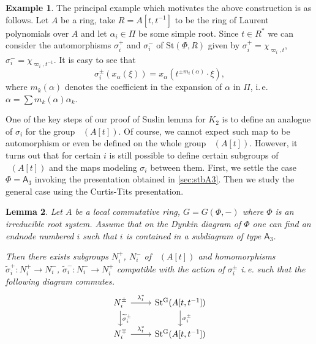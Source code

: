 \documentclass[oneside,12pt]{amsart}
\numberwithin{equation}{section}
\newtheorem{lem}{Lemma}
\numberwithin{lem}{section}
\theoremstyle{definition}
\newtheorem{example}[lem]{Example}
\theoremstyle{remark}
\DeclareMathOperator{\St}{St^G}
\newcommand{\Stb}{\mathrm{St}}
\newcommand{\rA}{\mathsf{A}}
\begin{document}
\begin{example} The principal example which motivates the above construction is as follows.
Let $A$ be a ring, take $R = A[t, t^{-1}]$ to be the ring of Laurent polynomials over $A$ and let $\alpha_i \in \Pi$ be some simple root.
Since $t \in R^*$ we can consider the automorphisms $\sigma_i^+$ and $\sigma_i^-$ of $\Stb(\Phi, R)$ given by $\sigma_i^+ = \chi_{\varpi_i, t}$, $\sigma_i^- = \chi_{\varpi_i, t^{-1}}$.
It is easy to see that 
\begin{equation}\label{eq:sigma_act} \sigma_i^\pm(x_\alpha(\xi)) = x_\alpha(t^{\pm m_i(\alpha)} \cdot \xi),\end{equation}
where $m_k(\alpha)$ denotes the coefficient in the expansion of $\alpha$ in $\Pi$, i.\,e. $\alpha = \sum m_k(\alpha) \alpha_k$.
\end{example}

One of the key steps of our proof of Suslin lemma for $K_2$ is to define an analogue of $\sigma_i$ for the group $\St(A[t])$.
Of course, we cannot expect such map to be automorphism or even be defined on the whole group $\St(A[t])$.
However, it turns out that for certain $i$ is still possible to define certain subgroups of $\St(A[t])$ and the maps modeling $\sigma_i$ between them.
First, we settle the case $\Phi=\rA_3$ invoking the presentation obtained in \ref{sec:stbA3}.
Then we study the general case using the Curtis-Tits presentation.

\begin{lem} \label{lem:sigma}
 Let $A$ be a local commutative ring, $G = G(\Phi, -)$ where $\Phi$ is an irreducible root system.
 Assume that on the Dynkin diagram of $\Phi$ one can find an endnode numbered $i$ such that $i$ is contained in a subdiagram of type $\rA_3$.

 Then there exists subgroups $N_i^+$, $N_i^-$ of $\St(A[t])$ and homomorphisms $\widetilde{\sigma}_i^+ \colon N_i^+ \to N_i^-$, $\widetilde{\sigma}_i^-\colon N_i^- \to N_i^+$
 compatible with the action of $\sigma_i^\pm$ i.\,e. such that the following diagram commutes.
 \[\begin{tikzcd} N_i^\pm \arrow[r, "\lambda_t^*"] \arrow[d, "\widetilde{\sigma}_i^\pm"]          &  \St(A[t, t^{-1}]) \ar[d, "\sigma_i^\pm"] \\
                  N_i^\mp \arrow[r, "\lambda_t^*"] &  \St(A[t, t^{-1}]) \end{tikzcd}\]

\end{lem}
\end{document}
